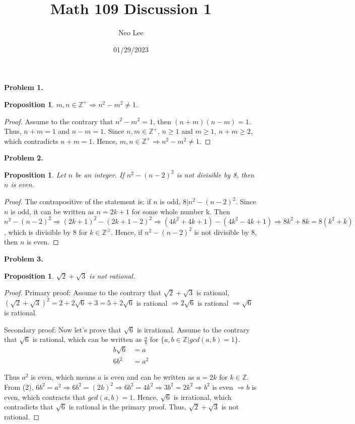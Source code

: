 \documentclass{article}
\title{Math 109 Discussion 1}
\author{Neo Lee}
\date{01/29/2023}
\newtheorem{prop}[thm]{Proposition}
\begin{document}
 

\maketitle 

\textbf{Problem 1.}
\begin{prop}
    $m, n \in \mathbb{Z^+} \Rightarrow n^2 - m^2 \neq 1$.
\end{prop}
\begin{proof}
    Assume to the contrary that $n^2 - m^2 = 1$, then $(n+m)(n-m) = 1$.
    Thus, $n+m=1$ and $n-m=1$. Since $n,m \in \mathbb{Z^+}$, $n \ge 1$ and $m \ge 1$, $n+m \ge 2$, which contradicts $n+m=1$.
    Hence, $m, n \in \mathbb{Z^+} \Rightarrow n^2 - m^2 \neq 1$.
\end{proof}

\textbf{Problem 2.}
\begin{prop}
    Let $n$ be an integer. If $n^2 - (n-2)^2$ is not divisible by 8, then $n$ is even.
\end{prop}
\begin{proof}
    The contrapositive of the statement is: if $n$ is odd, $8|n^2-(n-2)^2$. 
    Since $n$ is odd, it can be written as $n=2k+1$ for some whole number k.
    Then $n^2-(n-2)^2 \Rightarrow (2k+1)^2-(2k+1-2)^2 \Rightarrow (4k^2+4k+1)-(4k^2-4k+1) \Rightarrow 8k^2+8k = 8(k^2+k)$, which is divisible by 8 for $k \in \mathbb{Z^\ge}$.
    Hence, if $n^2 - (n-2)^2$ is not divisible by 8, then $n$ is even.
\end{proof}

\textbf{Problem 3.}
\begin{prop}
    $\sqrt{2} + \sqrt{3}$ is not rational.
\end{prop}
\begin{proof}
    Primary proof: Assume to the contrary that $\sqrt{2}+\sqrt{3}$ is rational, $(\sqrt{2}+\sqrt{3})^2 = 2 + 2\sqrt{6} + 3 = 5+2\sqrt{6}$ is rational $\Rightarrow 2\sqrt{6}$ is rational $\Rightarrow \sqrt{6}$ is rational.
    
    Secondary proof: Now let's prove that $\sqrt{6}$ is irrational. Assume to the contrary that $\sqrt{6}$ is rational, which can be written as $\frac{a}{b}$ for $\{a, b \in \mathbb{Z} | gcd(a, b)=1\}$. 
    \begin{align}
        b\sqrt{6} & = a \\
        6b^2 & = a^2
    \end{align}
    
    Thus $a^2$ is even, which means $a$ is even and can be written as $a = 2k$ for $k \in \mathbb{Z}$. From (2), $6b^2 = a^2 \Rightarrow 6b^2 = (2k)^2 \Rightarrow 6b^2 = 4k^2 \Rightarrow 3b^2 = 2k^2 \Rightarrow b^2$ is even $\Rightarrow b$ is even, which contracts that $gcd(a, b)=1$.
    Hence, $\sqrt{6}$ is irrational, which contradicts that $\sqrt{6}$ is rational is the primary proof.
    Thus, $\sqrt{2} + \sqrt{3}$ is not rational.
\end{proof}
\end{document}
